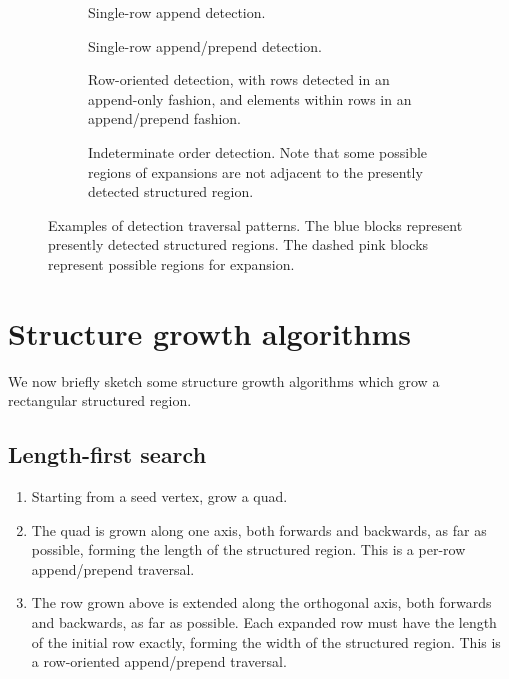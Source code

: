 \begin{figure}
\begin{subfigure}[t]{0.45\textwidth}
	\centering
	
	\caption{Single-row append detection.}
\end{subfigure}
\begin{subfigure}[t]{0.45\textwidth}
	\centering
	
	\caption{Single-row append/prepend detection.}
\end{subfigure}
\begin{subfigure}[b]{0.45\textwidth}
	\centering
	
	\vspace{4.5mm}
	\caption{Row-oriented detection, with rows detected in an append-only fashion, and elements within rows in an append/prepend fashion.}
\end{subfigure}
\begin{subfigure}[b]{0.45\textwidth}
	\centering
	
	\caption{Indeterminate order detection. Note that some possible regions of expansions are not adjacent to the presently detected structured region.}
\end{subfigure}

\caption{Examples of detection traversal patterns. The blue blocks represent presently detected structured regions. The dashed pink blocks represent possible regions for expansion.\label{fig:detection-traversal-patterns}}
\end{figure}



\section{Structure growth algorithms}
We now briefly sketch some structure growth algorithms which grow a rectangular structured region.

\subsection{Length-first search}
\label{subsec:length-first-search}

\begin{enumerate}
\item Starting from a seed vertex, grow a quad.

\item The quad is grown along one axis, both forwards and backwards, as far as possible, forming the length of the structured region. This is a per-row append/prepend traversal.
\item \label{step:row-expansion} The row grown above is extended along the orthogonal axis, both forwards and backwards, as far as possible. Each expanded row must have the length of the initial row exactly, forming the width of the structured region. This is a row-oriented append/prepend traversal.
\end{enumerate}

